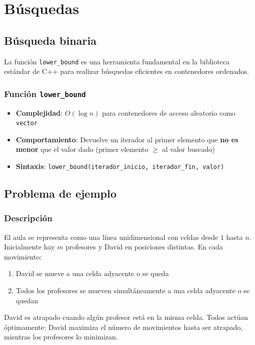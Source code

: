 \chapter{Búsquedas}

\section{Búsqueda binaria}
La función \texttt{lower\_bound} es una herramienta fundamental en la biblioteca estándar de C++ para realizar búsquedas eficientes en contenedores ordenados.

\subsection{Función \texttt{lower\_bound}}
\begin{itemize}
	\item \textbf{Complejidad}: $O(\log n)$ para contenedores de acceso aleatorio como \texttt{vector}
	\item \textbf{Comportamiento}: Devuelve un iterador al primer elemento que \textbf{no es menor} que el valor dado (primer elemento $\geq$ al valor buscado)
	\item \textbf{Sintaxis}: \texttt{lower\_bound(iterador\_inicio, iterador\_fin, valor)}
\end{itemize}

\section{Problema de ejemplo}

\subsection{Descripción}
El aula se representa como una línea unidimensional con celdas desde $1$ hasta $n$. Inicialmente hay $m$ profesores y David en posiciones distintas. En cada movimiento:
\begin{enumerate}
	\item David se mueve a una celda adyacente o se queda
	\item Todos los profesores se mueven simultáneamente a una celda adyacente o se quedan
\end{enumerate}

David es atrapado cuando algún profesor está en la misma celda. Todos actúan óptimamente: David maximiza el número de movimientos hasta ser atrapado, mientras los profesores lo minimizan.


